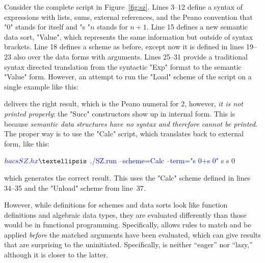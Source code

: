 \documentclass[11pt]{article} %
\begin{document}
\begin{example}
  Consider the complete \HAX script in Figure~\ref{fig:sz}. Lines 3--12 define a syntax of
  expressions with lists, sums, external references, and the Peano convention that "0" stands for
  itself and "s "$n$ stands for $n+1$. Line 15 defines a new semantic data sort, "Value", which
  represents the same information but outside of syntax brackets. Line 18 defines a scheme as
  before, except now it is defined in lines 19--23 also over the data forms with arguments. Lines
  25--31 provide a traditional syntax directed translation from the syntactic "Exp" format to the
  semantic "Value" form. However, an attempt to run the "Load" scheme of the script on a single
  example like this:
  delivers the right result, which is the Peano numeral for $2$,
  however, \emph{it is not printed properly}: the "Succ" constructors show up in internal form. This
  is because \emph{semantic data structures have no syntax and therefore cannot be printed}. The
  proper way is to use the "Calc" script, which translates back to external form, like this:
  \begin{code}[commandchars=\\\{\}]
$ \textcolor{blue}{hacs SZ.hx}
…
$ \textcolor{blue}{./SZ.run --scheme=Calc --term="s 0+s 0"}
 s  s  0   
  \end{code}
  which generates the correct result. This uses the "Calc" scheme defined in lines 34--35 and the
  "Unload" scheme from line~37.
\end{example}

However, while \HAX definitions for schemes and data sorts look like function definitions and
algebraic data types, they are evaluated differently than those would be in functional programming.
Specifically, \HAX allows rules to match and be applied \emph{before} the matched arguments have
been evaluated, which can give results that are surprising to the uninitiated. Specifically, \HAX is
neither ``eager'' nor ``lazy,'' although it is closer to the latter.
\end{document}
